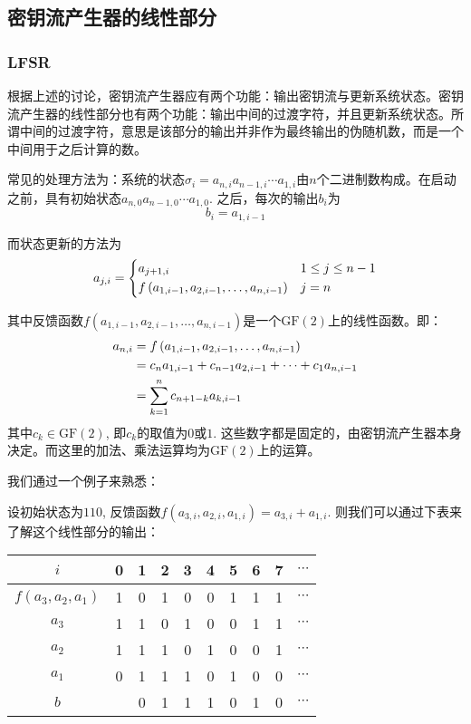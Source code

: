 \documentclass[UTF8]{ctexrep}
\def\pth#1{\left( {#1}\right)}
\def\GF{\mathrm{GF}}
\begin{document}
\subsection{密钥流产生器的线性部分}
\subsubsection{LFSR}
根据上述的讨论，密钥流产生器应有两个功能：输出密钥流与更新系统状态。密钥流产生器的线性部分也有两个功能：输出中间的过渡字符，并且更新系统状态。所谓中间的过渡字符，意思是该部分的输出并非作为最终输出的伪随机数，而是一个中间用于之后计算的数。\par
常见的处理方法为：系统的状态$\sigma_i=a_{n, i}a_{n-1, i}\cdots a_{1, i}$由$n$个二进制数构成。在启动之前，具有初始状态$a_{n, 0}a_{n-1, 0}\cdots a_{1, 0}$. 之后，每次的输出$b_i$为
\begin{equation}
    b_i=a_{1, i-1}
\end{equation}

而状态更新的方法为
\begin{equation}
    a_{j, i}=\begin{dcases}a_{j+1, i}&1\leq j\leq n-1\\f\pth{a_{1, i-1}, a_{2, i-1}, \ldots, a_{n, i-1}}&j=n\end{dcases}
\end{equation}

其中反馈函数$f\pth{a_{1, i-1}, a_{2, i-1}, \ldots, a_{n, i-1}}$是一个$\GF\pth{2}$上的线性函数。即：
\begin{align}
    a_{n, i}&=f\pth{a_{1, i-1}, a_{2, i-1}, \ldots, a_{n, i-1}}\notag\\
    &=c_na_{1, i-1}+c_{n-1}a_{2, i-1}+\cdots +c_1a_{n, i-1}\\
    &=\sum_{k=1}^nc_{n+1-k}a_{k, i-1}
\end{align}
其中$c_k\in\GF\pth{2}$, 即$c_k$的取值为$0$或$1$. 这些数字都是固定的，由密钥流产生器本身决定。而这里的加法、乘法运算均为$\GF\pth{2}$上的运算。\par
我们通过一个例子来熟悉：\par
设初始状态为$110$, 反馈函数$f(a_{3, i}, a_{2, i}, a_{1, i})=a_{3, i}+a_{1, i}$. 则我们可以通过下表来了解这个线性部分的输出：
\begin{table}[H]
    \centering
    \begin{tabular}{c|c|c|c|c|c|c|c|c|c}\hline
        $i$&0&1&2&3&4&5&6&7&$\cdots$\\\hline
        $f(a_3, a_2, a_1)$&1&0&1&0&0&1&1&1&$\cdots$\\\hline
        $a_3$&1&1&0&1&0&0&1&1&$\cdots$\\\hline
        $a_2$&1&1&1&0&1&0&0&1&$\cdots$\\\hline
        $a_1$&0&1&1&1&0&1&0&0&$\cdots$\\\hline
        $b$&&0&1&1&1&0&1&0&$\cdots$\\\hline
    \end{tabular}
\end{table}
\end{document}
